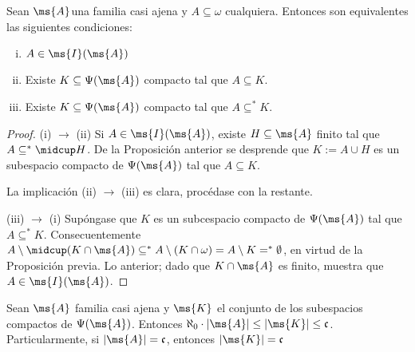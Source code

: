	\begin{corolario}\label{cor-IdealCompactosCarac}
		Sean $\ms{A}$una familia casi ajena y $A \subseteq \omega$ cualquiera. Entonces son equivalentes las siguientes condiciones:
		\begin{enumerate}[i)]
			\item $A \in \ms{I}(\ms{A})$
			\item Existe $K \subseteq \Psi(\ms{A})$ compacto tal que $A \subseteq K$.
			\item Existe $K \subseteq \Psi(\ms{A})$ compacto tal que $A \subseteq^* K$.
		\end{enumerate}
	\end{corolario}
	
	\begin{proof} 
		(i) $\to$ (ii) Si $A \in \ms{I}(\ms{A})$, existe $H \subseteq \ms{A}$ finito tal que $A \subseteq^* \midcup H$. De la Proposición anterior se desprende que $K:=A \cup H$ es un subespacio compacto de $\Psi(\ms{A})$ tal que $A \subseteq K$.
		
		La implicación (ii) $\to$ (iii) es clara, procédase con la restante.
		
		(iii) $\to$ (i) Supóngase que $K$ es un subcespacio compacto de $\Psi(\ms{A})$ tal que $A \subseteq^* K$. Consecuentemente $A \setminus \midcup (K \cap \ms{A}) \subseteq^* A \setminus (K \cap \omega) = A \setminus K =^* \emptyset$, en virtud de la Proposición previa. Lo anterior; dado que $K \cap \ms{A}$ es finito, muestra que $A \in \ms{I}(\ms{A})$.
	\end{proof}
	
	\begin{corolario}
		Sean $\ms{A}$ familia casi ajena y $\ms{K}$ el conjunto de los subespacios compactos de $\Psi(\ms{A})$. Entonces $\aleph_0 \cdot |\ms{A}| \leq |\ms{K}| \leq \mathfrak{c}$. Particularmente, si $|\ms{A}|=\mathfrak{c}$, entonces $|\ms{K}|=\mathfrak{c}$
	\end{corolario}
	
